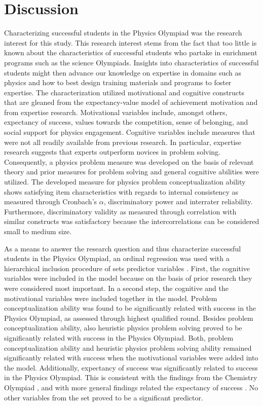 \documentclass[D:/studies/WinnerS/Erhebungen/IPhO1718/paper/problem_solving/main/TaylorFrancis/interactapasample]{subfiles}
\begin{document}
\section{Discussion}

Characterizing successful students in the Physics Olympiad was the research interest for this study. This research interest stems from the fact that too little is known about the characteristics of successful students who partake in enrichment programs such as the science Olympiads. Insights into characteristics of successful students might then advance our knowledge on expertise in domains such as physics and how to best design training materials and programs to foster expertise. The characterization utilized motivational and cognitive constructs that are gleaned from the expectancy-value model of achievement motivation and from expertise research. Motivational variables include, amongst others, expectancy of success, values towards the competition, sense of belonging, and social support for physics engagement. Cognitive variables include measures that were not all readily available from previous research. In particular, expertise research suggests that experts outperform novices in problem solving. Consequently, a physics problem measure was developed on the basis of relevant theory and prior measures for problem solving and general cognitive abilities were utilized. The developed measure for physics problem conceptualization ability shows satisfying item characteristics with regards to internal consistency as measured through Cronbach's $\alpha$, discriminatory power and interrater reliability. Furthermore, discriminatory validity as measured through correlation with similar constructs \citep{Campbell.1959} was satisfactory because the intercorrelations can be considered small to medium size. 

As a means to answer the research question and thus characterize successful students in the Physics Olympiad, an ordinal regression was used with a hierarchical inclusion procedure of sets predictor variables \citep{Field.2012}. First, the cognitive variables were included in the model because on the basis of prior research they were considered most important. In a second step, the cognitive and the motivational variables were included together in the model. Problem conceptualization ability was found to be significantly related with success in the Physics Olympiad, as assessed through highest qualified round. Besides problem conceptualization ability, also heuristic physics problem solving proved to be significantly related with success in the Physics Olympiad. Both, problem conceptualization ability and heuristic physics problem solving ability remained significantly related with success when the motivational variables were added into the model. Additionally, expectancy of success was significantly related to success in the Physics Olympiad. This is consistent with the findings from the Chemistry Olympiad \citep{Urhahne.2012}, and with more general findings related the expectancy of success \citep{Eccles.1995}. No other variables from the set proved to be a significant predictor.
\end{document}

